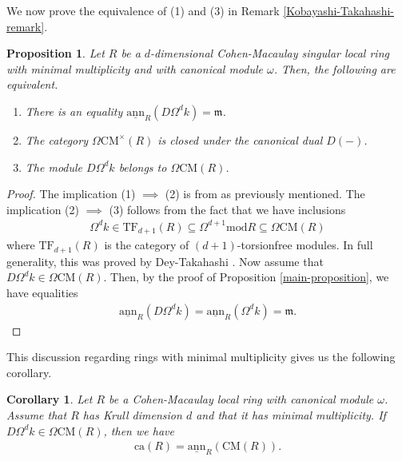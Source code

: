 \documentclass[12pt]{amsart}
\newcommand{\sann}{\underline{\mathrm{ann}}}
\newcommand\ca{\mathrm{ca}}
\newcommand{\m}{\mathfrak{m}}
\newcommand{\module}{\mathrm{mod}}
\newcommand{\CM}{\mathrm{CM}}
\newtheorem{proposition}[theorem]{Proposition}
\newtheorem{corollary}[theorem]{Corollary}
\theoremstyle{definition}
\numberwithin{equation}{theorem}
\begin{document}
We now prove the equivalence of (1) and (3) in Remark \ref{Kobayashi-Takahashi-remark}.
\begin{proposition}
    Let $R$ be a $d$-dimensional Cohen-Macaulay singular local ring with minimal multiplicity and with canonical module $\omega$. Then, the following are equivalent.
    \begin{enumerate}
        \item There is an equality $\sann_R(D\Omega^d k) = \m$.
        \item The category $\Omega \CM^\times(R)$ is closed under the canonical dual $D(-)$.
        \item The module $D \Omega^d k$ belongs to $\Omega \CM(R)$.
    \end{enumerate}
\end{proposition}
\begin{proof}
    The implication (1) $\implies$ (2) is from \cite[Corollary 3.11]{Kobayashi-Takahashi} as previously mentioned. The implication (2) $\implies$ (3) follows from the fact that we have inclusions
    \begin{align*}
    \Omega^d k \in \mathrm{TF}_{d+1}(R) \subseteq \Omega^{d+1}{\module R} \subseteq \Omega \CM(R)
    \end{align*}
    where $\mathrm{TF}_{d+1}(R)$ is the category of $(d+1)$-torsionfree modules. In full generality, this was proved by Dey-Takahashi \cite[Theorem 4.1(2)]{Dey-Takahashi}. Now assume that $D\Omega^d k \in \Omega\CM(R)$. Then, by the proof of Proposition \ref{main-proposition}, we have equalities 
    \begin{align*}
    \sann_R(D \Omega^d k) = \sann_R(\Omega^d k) = \m.
    \end{align*}
     
\end{proof}
This discussion regarding rings with minimal multiplicity gives us the following corollary.
\begin{corollary}
    Let $R$ be a Cohen-Macaulay local ring with canonical module $\omega$. Assume that $R$ has Krull dimension $d$ and that it has minimal multiplicity. If $D \Omega^d k \in \Omega \CM(R)$, then we have 
    \begin{align*}
    \ca(R) = \sann_R(\CM(R)).
    \end{align*}
\end{corollary}
\end{document}
